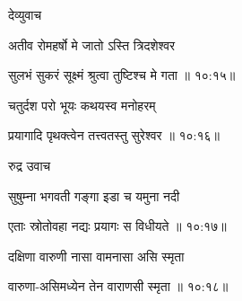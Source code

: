 {\devanagarifont देव्युवाच {\dandab}\dontdisplaylinenum  }%
 
{\devanagarifont अतीव रोमहर्षो मे जातो ऽस्ति त्रिदशेश्वर \thinspace{\danda} \dontdisplaylinenum }%


{\devanagarifont सुलभं सुकरं सूक्ष्मं श्रुत्वा तुष्टिश्च मे गता {॥ १०:१५॥} \veg\dontdisplaylinenum }%

{\devanagarifont चतुर्दश परो भूयः कथयस्व मनोहरम् \thinspace{\dandab} \dontdisplaylinenum }%
 

{\devanagarifont प्रयागादि पृथक्त्वेन तत्त्वतस्तु सुरेश्वर {॥ १०:१६॥} \veg\dontdisplaylinenum }%



{\devanagarifont रुद्र उवाच {\dandab}\dontdisplaylinenum  }%
 
{\devanagarifont सुषुम्ना भगवती गङ्गा इडा च यमुना नदी \thinspace{\danda} \dontdisplaylinenum }%


{\devanagarifont एताः स्रोतोवहा नद्यः प्रयागः स विधीयते {॥ १०:१७॥} \veg\dontdisplaylinenum }%

{\devanagarifont दक्षिणा वारुणी नासा वामनासा असि स्मृता \thinspace{\dandab} \dontdisplaylinenum }%


{\devanagarifont वारुणा-असिमध्येन तेन वाराणसी स्मृता {॥ १०:१८॥} \veg\dontdisplaylinenum }%


